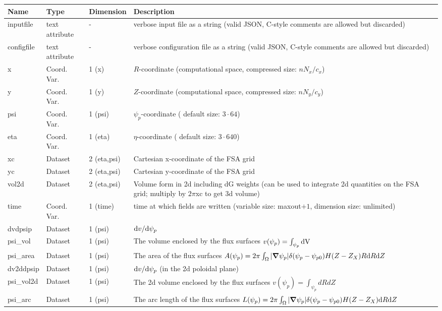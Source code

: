 \begin{longtable}{lll>{\RaggedRight}p{7cm}}
\toprule
\rowcolor{gray!50}\textbf{Name} &  \textbf{Type} & \textbf{Dimension} & \textbf{Description}  \\ \midrule
inputfile  &     text attribute & - & verbose input file as a string (valid JSON, C-style comments are allowed but discarded) \\
configfile   &     text attribute & - & verbose configuration file as a string (valid JSON, C-style comments are allowed but discarded) \\
x                & Coord. Var. & 1 (x) & $R$-coordinate (computational space, compressed size: $nN_x/c_x$)\\
y                & Coord. Var. & 1 (y) & $Z$-coordinate (computational space, compressed size: $nN_y/c_y$)\\
psi              & Coord. Var. & 1 (psi) & $\psi_p$-coordinate ( default size: $3\cdot 64$) \\
eta              & Coord. Var. & 1 (eta) & $\eta$-coordinate ( default size: $3\cdot 640$) \\
xc               & Dataset & 2 (eta,psi) & Cartesian x-coordinate of the FSA grid \\
yc               & Dataset & 2 (eta,psi) & Cartesian y-coordinate of the FSA grid\\
vol2d            & Dataset & 2 (eta,psi) & Volume form in 2d including dG weights (can be used to integrate 2d quantities on the FSA grid; multiply by $2\pi$xc to get 3d volume)  \\
time             & Coord. Var. & 1 (time)& time at which fields are written (variable size: maxout$+1$, dimension size: unlimited) \\
dvdpsip          & Dataset & 1 (psi) & $\mathrm{d} v/\mathrm{d}\psi_p$ \\
psi\_vol         & Dataset & 1 (psi) & The volume enclosed by the flux surfaces $v(\psi_p) = \int_{\psi_p} \mathrm{dV}\, $ \\
psi\_area        & Dataset & 1 (psi) & The area of the flux surfaces $A(\psi_p) = 2\pi \int_\Omega |{\boldsymbol{\nabla}}\psi_p| \delta(\psi_p - \psi_{p0}) H(Z-Z_X) R\mathrm{d} R\mathrm{d} Z$ \\
dv2ddpsip        & Dataset & 1 (psi) & $\mathrm{d} v/\mathrm{d}\psi_p$ (in the 2d poloidal plane) \\
psi\_vol2d       & Dataset & 1 (psi) & The 2d volume enclosed by the flux surfaces $v(\psi_p) = \int_{\psi_p} dRdZ $ \\
psi\_arc         & Dataset & 1 (psi) & The arc length of the flux surfaces $L(\psi_p) = 2\pi \int_\Omega |{\boldsymbol{\nabla}}\psi_p| \delta(\psi_p - \psi_{p0}) H(Z-Z_X) \mathrm{d} R\mathrm{d} Z$ \\

\end{longtable}
